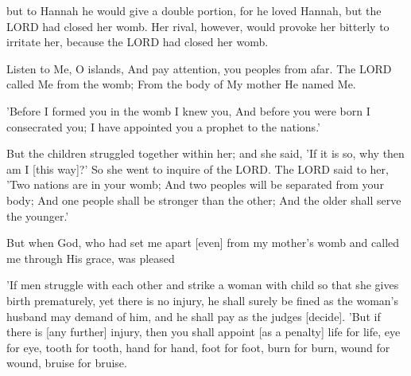 \begin{scripture}[1 Samuel 1:5-6]
    but to Hannah he would give a double portion, for he loved Hannah, but the LORD had closed her womb.
    Her rival, however, would provoke her bitterly to irritate her, because the LORD had closed her womb.
\end{scripture}

\begin{scripture}[Isaiah 49:1]
    Listen to Me, O islands, And pay attention, you peoples from afar. The LORD called Me from the womb; From the body of My mother He named Me.
\end{scripture}

\begin{scripture}[Jeremiah 1:5]
    'Before I formed you in the womb I knew you, And before you were born I consecrated you; I have appointed you a prophet to the nations.'
\end{scripture}

\begin{scripture}[Genesis 25:22-23]
    But the children struggled together within her; and she said, 'If it is so, why then am I [this way]?' So she went to inquire of the LORD.
    The LORD said to her, 'Two nations are in your womb; And two peoples will be separated from your body; And one people shall be stronger than the other; And the older shall serve the younger.'
\end{scripture}

\begin{scripture}[Galatians 1:15]
    But when God, who had set me apart [even] from my mother's womb and called me through His grace, was pleased
\end{scripture}

\begin{scripture}[Exodus 21:22-25]
    'If men struggle with each other and strike a woman with child so that she gives birth prematurely, yet there is no injury, he shall surely be fined as the woman's husband may demand of him, and he shall pay as the judges [decide].
    'But if there is [any further] injury, then you shall appoint [as a penalty] life for life,
    eye for eye, tooth for tooth, hand for hand, foot for foot,
    burn for burn, wound for wound, bruise for bruise.
\end{scripture}

